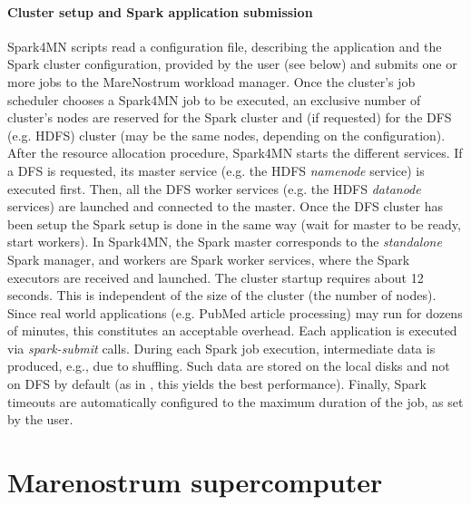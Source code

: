 \documentclass[journal]{IEEEtran}
\begin{document}
\paragraph{Cluster setup and Spark application submission}
Spark4MN scripts read a configuration file, describing the application and the Spark cluster configuration, provided by the user (see below) and submits one or more jobs to the MareNostrum workload manager. Once the cluster's job scheduler chooses a Spark4MN job to be executed, an exclusive number of cluster's nodes are reserved for the Spark cluster and (if requested) for the DFS (e.g. HDFS) cluster (may be the same nodes, depending on the configuration). After the resource allocation procedure, Spark4MN starts the different services. If a DFS is requested, its master service (e.g. the HDFS {\it namenode} service) is executed first. Then, all the DFS worker services (e.g. the HDFS {\it datanode} services) are launched and connected to the master. Once the DFS cluster has been setup the Spark setup is done in the same way (wait for master to be ready, start workers). In Spark4MN, the Spark master corresponds to the \emph{standalone} Spark manager, and workers are Spark
worker services, where the Spark executors are received and launched. The cluster startup requires about 12 seconds. This is independent of the size of the cluster (the number of nodes). Since real world applications (e.g. PubMed article processing) may run for dozens of minutes, this constitutes an acceptable overhead.
Each application is executed via {\it spark-submit} calls.
During each Spark job execution, intermediate data is produced, e.g., due to shuffling. Such data are stored on the local disks and not on DFS by default (as in \cite{michael2014}, this yields the best performance). Finally, Spark timeouts are automatically configured to the maximum duration of the job, as set by the user.

\section{Marenostrum supercomputer}
\label{sec:marenostrum}
\end{document}

